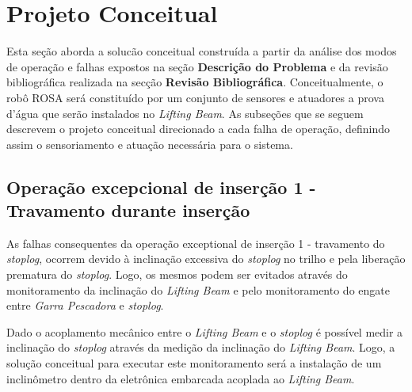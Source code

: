 



\section{Projeto Conceitual}
Esta seção aborda a solucão conceitual construída a partir da análise dos modos de operação e falhas expostos na seção {\bf Descrição do Problema} e da revisão bibliográfica realizada na secção {\bf Revisão Bibliográfica}. Conceitualmente, o robô ROSA será constituído por um conjunto de sensores e
atuadores a prova d'água que serão instalados no \emph{Lifting Beam}.
As subseções que se seguem descrevem o projeto conceitual direcionado a cada
falha de operação, definindo assim o sensoriamento e atuação necessária para o sistema. 



\subsection{Operação excepcional de inserção 1 - Travamento durante inserção}

As falhas consequentes da operação exceptional de inserção 1 - travamento do
\emph{stoplog}, ocorrem devido à inclinação excessiva do \emph{stoplog} no
trilho e pela liberação prematura do \emph{stoplog}. Logo, os mesmos podem ser evitados através do monitoramento da inclinação do \emph{Lifting Beam} e pelo monitoramento do engate entre \emph{Garra Pescadora} e  \emph{stoplog}.

Dado o acoplamento mecânico entre o \emph{Lifting Beam} e o \emph{stoplog} é
possível medir a inclinação do \emph{stoplog} através da medição da inclinação do \emph{Lifting Beam}. Logo, a solução conceitual para executar este monitoramento será a instalação de um inclinômetro dentro da eletrônica embarcada acoplada ao \emph{Lifting Beam}.


